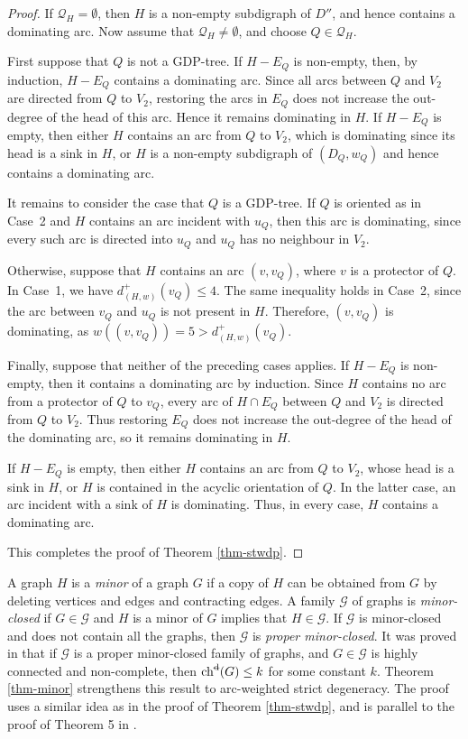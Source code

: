 \documentclass[11pt,a4paper]{article}
\theoremstyle{definition}
\begin{document}
\begin{proof}
If $\mathcal Q_H=\emptyset$, then $H$ is a non-empty subdigraph of $D''$, and hence contains a dominating arc. Now assume that $\mathcal Q_H\ne\emptyset$, and choose $Q\in\mathcal Q_H$.

First suppose that $Q$ is not a GDP-tree. If $H-E_Q$ is non-empty, then, by induction, $H-E_Q$ contains a dominating arc. Since all arcs between $Q$ and $V_2$ are directed from $Q$ to $V_2$, restoring the arcs in $E_Q$ does not increase the out-degree of the head of this arc. Hence it remains dominating in $H$. If $H-E_Q$ is empty,
then either $H$ contains an arc from $Q$ to $V_2$, which is dominating since its head is a sink in $H$, or $H$ is a non-empty subdigraph of $(D_Q,w_Q)$ and hence contains a dominating arc.

It remains to consider the case that $Q$ is a GDP-tree. If $Q$ is oriented as in Case~2 and $H$ contains an arc incident with $u_Q$, then this arc is dominating, since every such arc is directed into
$u_Q$ and $u_Q$ has no neighbour in $V_2$.

Otherwise, suppose that $H$ contains an arc $(v,v_Q)$, where $v$ is a protector of $Q$. In Case~1, we have $d^+_{(H,w)}(v_Q)\le 4$.
The same inequality holds in Case~2, since the arc between $v_Q$ and $u_Q$ is not present in $H$. Therefore, $(v,v_Q)$ is dominating, as $w((v,v_Q))=5>d^+_{(H,w)}(v_Q)$.

Finally, suppose that neither of the preceding cases applies. If $H-E_Q$ is non-empty, then it contains a dominating arc by induction. Since $H$ contains no arc from a protector of $Q$ to $v_Q$, every arc of $H\cap E_Q$ between $Q$ and $V_2$ is directed from $Q$ to $V_2$. Thus restoring $E_Q$ does not increase the out-degree of the head of the dominating arc, so it remains dominating in $H$.

If $H-E_Q$ is empty, then either $H$ contains an arc from $Q$ to $V_2$, whose head is a sink in $H$, or $H$ is contained in the acyclic orientation of $Q$. In the latter case, an arc incident with a sink of $H$ is dominating. Thus, in every case, $H$ contains a dominating arc.


This completes the proof of Theorem \ref{thm-stwdp}.
\end{proof}


A graph $H$ is a {\em minor} of a graph $G$ if a copy of $H$ can be obtained from $G$ by deleting vertices and edges and contracting edges. A family $\mathcal{G}$ of graphs is {\em minor-closed} if $G \in \mathcal{G}$ and $H$ is a minor of $G$ implies that $H \in \mathcal{G}$. If $\mathcal{G}$ is minor-closed and does not contain all the graphs, then $\mathcal{G}$ is   {\em proper minor-closed}.  It was proved in \cite{ZZZ25} that if  $\mathcal{G}$ is a proper minor-closed family of graphs, and $G \in \mathcal{G}$ is highly connected and non-complete, then $\operatorname{ch}^{\text{\st{d}}}(G) \le k $ for some constant $k$. 
Theorem \ref{thm-minor} strengthens this result to arc-weighted strict degeneracy.  The proof uses a similar idea as in the proof of Theorem \ref{thm-stwdp}, and is  parallel to the proof of Theorem 5 in \cite{ZZZ25}. 
 
\end{document}
